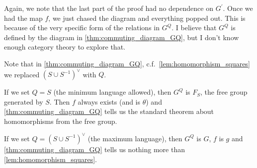 \begin{remark}
	Again, we note that the last part of the proof had no dependence on $G^\prime$. Once we had the map $f$, we just chased the diagram and everything popped out. This is because of the very specific form of the relations in  $G^Q$. I believe that  $G^Q$ is defined by the diagram in \cref{thm:commuting_diagram_GQ}, but I don't know enough category theory to explore that.
\end{remark}
\begin{remark}
	Note that in \cref{thm:commuting_diagram_GQ}, c.f.~\cref{lem:homomorphism_squares} we replaced $(S \cup S^{-1})^\vee$ with $Q$.
\end{remark}
\begin{remark}
	If we set $Q = S$ (the minimum language allowed), then  $G^Q$ is  $F_S$, the free group generated by  $S$. Then  $f$ always exists (and is  $\theta$) and \cref{thm:commuting_diagram_GQ} tells us the standard theorem about homomorphisms from the free group.
\end{remark}
\begin{remark}
	If we set $Q = (S \cup S^{-1})^\vee$ (the maximum language), then $G^Q$ is  $G$, $f$ is  $g$ and \cref{thm:commuting_diagram_GQ} tells us nothing more than  \cref{lem:homomorphism_squares}.
\end{remark}


